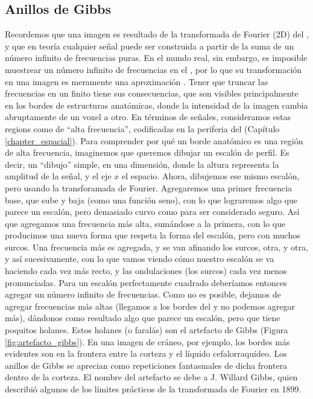 \subsection{Anillos de Gibbs}
Recordemos que una imagen es resultado de la transformada de Fourier (2D) del \espaciok, y que en teoría cualquier señal puede ser construida a partir de la suma de un número infinito de frecuencias puras. En el mundo real, sin embargo, es imposible muestrear un número infinito de frecuencias en el \espaciok, por lo que su transformación en una imagen  es meramente una aproximación \cite{gallagher2008fourier}. Tener que truncar las frecuencias en un \espaciok finito tiene sus consecuencias, que son visibles principalmente en los bordes de estructuras anatómicas, donde la intensidad de la imagen cambia abruptamente de un voxel a otro. En términos de señales, consideramos estas regions como de ``alta frecuencia'', codificadas en la periferia del \espaciok (Capítulo \ref{chapter_espacial}). Para comprender por qué un borde anatómico es una región de alta frecuencia, imaginemos que queremos dibujar un escalón de perfil. Es decir, un ``dibujo'' simple, en una dimensión, donde la altura representa la amplitud de la señal, y el eje $x$ el espacio. Ahora, dibujemos ese mismo escalón, pero usando la transforamada de Fourier. Agregaremos una primer frecuencia base, que sube y baja (como una función seno), con lo que lograremos algo que parece un escalón, pero demasiado curvo como para ser considerado seguro. Así que agregamos una frecuencia más alta, sumándose a la primera, con lo que producimos una nueva forma que respeta la forma del escalón, pero con muchos surcos. Una frecuencia más es agregada, y se van afinando los surcos, otra, y otra, y así sucesivamente, con lo que vamos viendo cómo nuestro escalón se va haciendo cada vez más recto, y las ondulaciones (los surcos) cada vez menos pronunciadas. Para un escalón perfectamente cuadrado deberíamos entonces agregar un número infinito de frecuencias. Como no es posible, dejamos de agregar frecuencias más altas (llegamos a los bordes del \espaciok y no podemos agregar más), dándonos como resultado algo que parece un escalón, pero que tiene poquitos holanes. Estos holanes (o faralás) son el artefacto de Gibbs (Figura \ref{fig:artefacto_gibbs}). En una imagen de cráneo, por ejemplo, los bordes más evidentes son en la frontera entre la corteza y el líquido cefalorraquídeo. Los anillos de Gibbs se aprecian como repeticiones fantasmales de dicha frontera dentro de la corteza. El nombre del artefacto se debe a J. Willard Gibbs, quien describió algunos de los límites prácticos de la transformada de Fourier en 1899.

